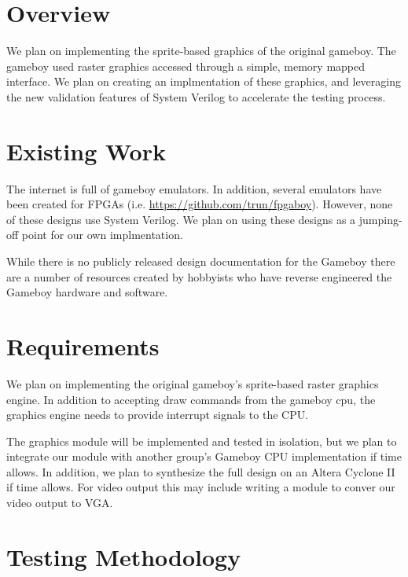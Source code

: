 \documentclass{article}
\begin{document}
\newenvironment{frcseries}{\fontfamily{frc}\selectfont}{}
\newcommand{\textfrc}[1]{{\frcseries#1}}
\newcommand{\mathfrc}[1]{\text{\textfrc{#1}}}




\section{Overview}
We plan on implementing the sprite-based graphics of the original
gameboy. The gameboy used raster graphics accessed through a simple,
memory mapped interface. We plan on creating an implmentation of these
graphics, and leveraging the new validation features of System Verilog
to accelerate the testing process. 

\section{Existing Work}
The internet is full of gameboy emulators. In addition, several
emulators have been created for FPGAs (i.e.
\url{https://github.com/trun/fpgaboy}). However, none of these designs
use System Verilog. We plan on using these designs as a jumping-off
point for our own implmentation.

While there is no publicly released design documentation for the 
Gameboy there are a number of resources created by hobbyists who 
have reverse engineered the Gameboy hardware and software.

\section{Requirements}

We plan on implementing the original gameboy's sprite-based raster
graphics engine. In addition to accepting draw commands from the
gameboy cpu, the graphics engine needs to provide interrupt signals to
the CPU. 

The graphics module will be implemented and tested in isolation, 
but we plan to integrate our module with another group's Gameboy CPU 
implementation if time allows.  In addition, we plan to synthesize
the full design on an Altera Cyclone II if time allows.
For video output this may include writing a module to conver our 
video output to VGA.


\section{Testing Methodology}
\end{document}
